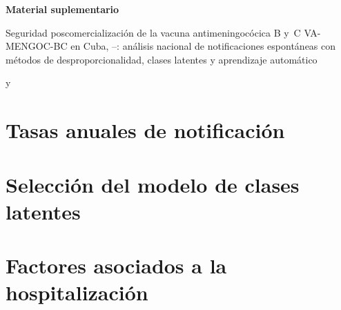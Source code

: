 \documentclass[11pt]{article}
\begin{document}
\SupplementaryNumbering
\SyntheticNotice
\begin{center}
{\Large\bfseries Material suplementario\par}
\medskip
{\large Seguridad poscomercialización de la vacuna antimeningocócica B y~C VA-MENGOC-BC en Cuba,
\VStudyFirstYear--\VStudyLastYear: análisis nacional de notificaciones espontáneas con métodos de
desproporcionalidad, clases latentes y aprendizaje automático\par}
\medskip
{\small \AuthorOne{} y \AuthorTwo\par}
\end{center}

\tableofcontents

\section{Tasas anuales de notificación}\label{sec:S-rates}
\begin{table}[htbp]
\centering\small
\caption{Notificaciones anuales de ESAVI con VA-MENGOC-BC, dosis administradas y tasas de
notificación por \num{100000} dosis con intervalos de confianza de Poisson exactos del 95\,\%. La
razón compara cada tasa con la tasa esperada del programa, de \POExpectedRate{} por \num{100000}
dosis para todas las vacunas infantiles. Los años sin denominador de dosis muestran una raya.}
\label{tab:S-rates}
\POTableRates
\end{table}

\section{Selección del modelo de clases latentes}\label{sec:S-lca}
\begin{table}[htbp]
\centering\small
\caption{Modelos de clases latentes con $K=\POLCAKMin,\dots,\POLCAKMax$ clases ajustados a los
indicadores de eventos con prevalencia de al menos el 0,5\,\%. Se seleccionó el modelo con menor BIC;
el ICL-BIC penaliza las clases poco separadas y la $R^2$ de entropía mide la certeza de la
clasificación (1 = perfecta).}
\label{tab:S-lca}
\POTableLCASelection
\end{table}

\section{Factores asociados a la hospitalización}\label{sec:S-logistic}
\begin{table}[htbp]
\centering\small
\caption{Razones de odds ajustadas de hospitalización del modelo de regresión logística de Firth
multivariable ajustado a la población de análisis (intervalos de confianza de Wald del 95\,\%). Los
contrastes por región se refieren a la región occidental; los términos de eventos y vacunas son
indicadores de presencia frente a ausencia. Se suprimen los términos registrados en menos de
\VMinCell{} notificaciones.}
\label{tab:S-logistic}
\POTableLogistic
\end{table}
\end{document}
